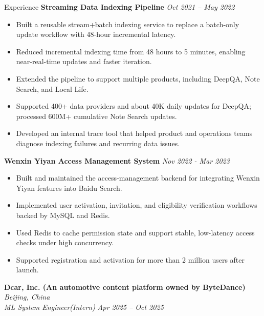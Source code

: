 \documentclass[]{resume}
\begin{document}
\begin{rSection}{Experience}
\vspace{0.5ex}
\textbf{Streaming Data Indexing Pipeline} \hfill \textit{Oct 2021 -- May 2022}
\begin{itemize}[leftmargin=1.2em, itemsep=0.2em, topsep=0.2em]
    \item Built a reusable stream+batch indexing service to replace a batch-only update workflow with 48-hour incremental latency.
    \item Reduced incremental indexing time from 48 hours to 5 minutes, enabling near-real-time updates and faster iteration.
    \item Extended the pipeline to support multiple products, including DeepQA, Note Search, and Local Life.
    \item Supported 400+ data providers and about 40K daily updates for DeepQA; processed 600M+ cumulative Note Search updates.
    \item Developed an internal trace tool that helped product and operations teams diagnose indexing failures and recurring data issues.
\end{itemize}

\vspace{0.5ex}
\textbf{Wenxin Yiyan Access Management System} \hfill \textit{Nov 2022 - Mar 2023}
\begin{itemize}[leftmargin=1.2em, itemsep=0.2em, topsep=0.2em]
    \item Built and maintained the access-management backend for integrating Wenxin Yiyan features into Baidu Search.
    \item Implemented user activation, invitation, and eligibility verification workflows backed by MySQL and Redis.
    \item Used Redis to cache permission state and support stable, low-latency access checks under high concurrency.
    \item Supported registration and activation for more than 2 million users after launch.
\end{itemize}

\vspace{1.0ex}
\textbf{Dcar, Inc. (An automotive content platform owned by ByteDance)} \hfill \textit{Beijing, China}\\
\textit{ML System Engineer(Intern)} \hfill \textit{Apr 2025 -- Oct 2025}


\end{rSection}
\end{document}
